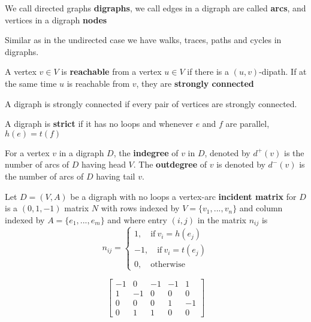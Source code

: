 			\begin{definition}
				We call directed graphs \textbf{digraphs}, we call edges in a digraph are called \textbf{arcs}, and vertices in a digraph \textbf{nodes}
			\end{definition}

			\begin{definition}
				Similar as in the undirected case we have walks, traces, paths and cycles in digraphs.
			\end{definition}

			\begin{definition}
				A vertex $v\in V$ is \textbf{reachable} from a vertex $u \in V$ if there is a $(u,v)$-dipath. If at the same time $u$ is reachable from $v$, they are \textbf{strongly connected}
			\end{definition}

			\begin{definition}
				A digraph is strongly connected if every pair of vertices are strongly connected.
			\end{definition}

			\begin{definition}
				A digraph is \textbf{strict} if it has no loops and whenever $e$ and $f$ are parallel, $h(e) = t(f)$
			\end{definition}

			\begin{definition}
				For a vertex $v$ in a digraph $D$, the \textbf{indegree} of $v$ in $D$, denoted by $d^+(v)$ is the number of arcs of $D$ having head $V$. The \textbf{outdegree} of $v$ is denoted by $d^-(v)$ is the number of arcs of $D$ having tail $v$.
			\end{definition}

			Let $D=(V, A)$ be a digraph with no loops a vertex-arc \textbf{incident matrix} for $D$ is a $(0, 1, -1)$ matrix $N$ with rows indexed by $V = \{v_1, ..., v_n\}$ and column indexed by $A = \{e_1, ..., e_m\}$ and where entry $(i, j)$ in the matrix $n_{ij}$ is
			\begin{equation}
				n_{ij} = \begin{cases}
					1, \quad \text{if} \ v_i = h(e_j) \\
					-1, \quad \text{if} \ v_i = t(e_j) \\
					0, \quad \text{otherwise}
				\end{cases}
			\end{equation}

			\begin{equation}
				\begin{bmatrix}
					-1 & 0 & -1 & -1 & 1 \\
					1 & -1 & 0 & 0 & 0 \\
					0 & 0 & 0 & 1 & -1 \\
					0 & 1 & 1 & 0 & 0
				\end{bmatrix}
			\end{equation}


